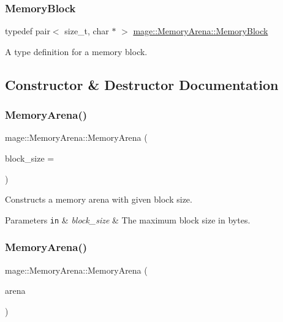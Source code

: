 \subsubsection{\texorpdfstring{Memory\+Block}{MemoryBlock}}
{\footnotesize\ttfamily typedef pair$<$ size\+\_\+t, char $\ast$ $>$ \hyperlink{classmage_1_1_memory_arena_a6026a114bb2ecc405dd5ebf54e4c12d5}{mage\+::\+Memory\+Arena\+::\+Memory\+Block}\hspace{0.3cm}{\ttfamily [private]}}

A type definition for a memory block. 

\subsection{Constructor \& Destructor Documentation}
\hypertarget{classmage_1_1_memory_arena_ac90beb8cf8dc42944a0fd6a4a9e8355c}{}\label{classmage_1_1_memory_arena_ac90beb8cf8dc42944a0fd6a4a9e8355c} 
\subsubsection{\texorpdfstring{Memory\+Arena()}{MemoryArena()}\hspace{0.1cm}{\footnotesize\ttfamily [1/3]}}
{\footnotesize\ttfamily mage\+::\+Memory\+Arena\+::\+Memory\+Arena (\begin{DoxyParamCaption}\item[{size\+\_\+t}]{block\+\_\+size = {} }\end{DoxyParamCaption})\hspace{0.3cm}{\ttfamily [explicit]}}

Constructs a memory arena with given block size.


\begin{DoxyParams}[1]{Parameters}
\mbox{\tt in}  & {\em block\+\_\+size} & The maximum block size in bytes. \\
\hline
\end{DoxyParams}
\hypertarget{classmage_1_1_memory_arena_a1eca6fdacbd1226f4b21f443d118168b}{}\label{classmage_1_1_memory_arena_a1eca6fdacbd1226f4b21f443d118168b} 
\subsubsection{\texorpdfstring{Memory\+Arena()}{MemoryArena()}\hspace{0.1cm}{\footnotesize\ttfamily [2/3]}}
{\footnotesize\ttfamily mage\+::\+Memory\+Arena\+::\+Memory\+Arena (\begin{DoxyParamCaption}\item[{const \hyperlink{classmage_1_1_memory_arena}{Memory\+Arena} \&}]{arena }\end{DoxyParamCaption})\hspace{0.3cm}{\ttfamily [delete]}}

